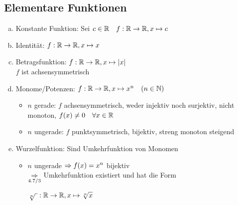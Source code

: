 \documentclass[10pt, a4paper, fleqn]{article}
\begin{document}
    \subsection{Elementare Funktionen}
    \begin{enumerate}[a)]
        \item Konstante Funktion: Sei $c \in \mathbb{R} \quad f: \mathbb{R} \to \mathbb{R}, x \mapsto c$
        \item Identität: $f: \mathbb{R} \to \mathbb{R}, x \mapsto x$
        \item Betragsfunktion: $f: \mathbb{R} \to \mathbb{R}, x \mapsto |x|$ \\ %
            $f$ ist achsensymmetrisch
        \item Monome/Potenzen: 
        $f: \mathbb{R} \to \mathbb{R}, x \mapsto x^n \quad (n \in \mathbb{N})$
        \begin{itemize}
            \item $n$ gerade: $f$ achsensymmetrisch, weder injektiv noch surjektiv, nicht
            monoton, $f(x) \neq 0 \quad \forall x \in \mathbb{R}$
            \item $n$ ungerade: $f$ punktsymmetrisch, bijektiv, streng monoton steigend
        \end{itemize}

        \item Wurzelfunktion:
        Sind Umkehrfunktion von Monomen
        \begin{itemize}
            \item $n$ ungerade
            $\Rightarrow f(x) = x^n$ bijektiv \\
            $\underset{4.7/3}{\Rightarrow}$ Umkehrfunktion existiert und hat die Form
            
            $\sqrt[n]{\ }: \mathbb{R} \to \mathbb{R}, x \mapsto \sqrt[n]{x}$
        \end{itemize}
    \end{enumerate}
\ifdefined\MAINDOC\else
\end{document}
